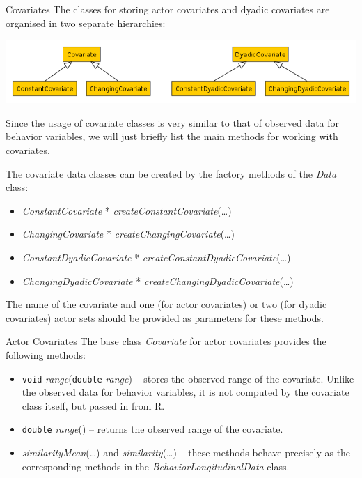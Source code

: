 \documentclass[12pt]{article}
\makeatletter
\renewcommand{\=}{\,=\,}
\newcommand{\+}{\,+\,}
\newcommand{\nnm}[1]{\textsf{\small\textit{#1}}}
\renewcommand{\subsection}{\@startsection{subsection}{2}
                {0pt}{0.7\baselineskip}{0.3\baselineskip}
                {\sffamily} }
\renewcommand{\subsubsection}{\@startsection{subsubsection}{3}
                {0pt}{0.7\baselineskip}{0.3\baselineskip}
                {\sffamily} }
\makeatother
\begin{document}
\subsection{Covariates}
The classes for storing actor covariates and dyadic covariates are organised in
two separate hierarchies:
\begin{center}
\includegraphics[scale=.5]{Covariates.png}
\end{center}
Since the usage of covariate classes is very similar to that of observed data
for behavior variables, we will just briefly list the main methods for working
with covariates.

The covariate data classes can be created by the factory methods of the
\nnm{Data} class:
\begin{itemize}
\item \nnm{ConstantCovariate} * \nnm{createConstantCovariate}(\ldots)
\item \nnm{ChangingCovariate} * \nnm{createChangingCovariate}(\ldots)
\item \nnm{ConstantDyadicCovariate} *
\nnm{createConstantDyadicCovariate}(\ldots)
\item \nnm{ChangingDyadicCovariate} *
\nnm{createChangingDyadicCovariate}(\ldots)
\end{itemize}
The name of the covariate and one (for actor covariates) or two (for dyadic
covariates) actor sets should be provided as parameters for these methods.

\subsubsection{Actor Covariates}
The base class \nnm{Covariate} for actor covariates provides the following
methods:
\begin{itemize}
\item \verb|void| \nnm{range}(\verb|double| \nnm{range}) -- stores the observed
range of the covariate. Unlike the observed data for behavior variables, it is
not computed by the covariate class itself, but passed in from R.
\item \verb|double| \nnm{range}() -- returns the observed range of the
covariate.
\item \nnm{similarityMean}(\ldots) and \nnm{similarity}(\ldots) -- these methods
behave precisely as the corresponding methods in the
\nnm{BehaviorLongitudinalData} class.
\end{itemize}
\end{document}
